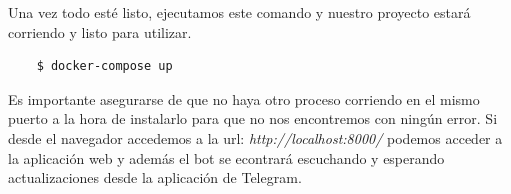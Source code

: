 Una vez todo esté listo, ejecutamos este comando y nuestro proyecto estará corriendo y listo para utilizar.

\begin{verbatim}
    $ docker-compose up
\end{verbatim}

Es importante asegurarse de que no haya otro proceso corriendo en el mismo puerto a la hora de instalarlo para que no nos encontremos con ningún error. Si desde el navegador accedemos a la url: \textit{http://localhost:8000/} podemos acceder a la aplicación web y además el bot se econtrará escuchando y esperando actualizaciones desde la aplicación de Telegram.